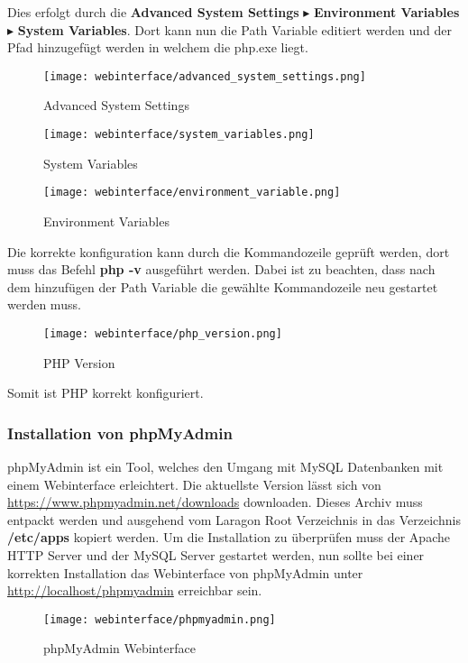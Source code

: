 Dies erfolgt durch die \textbf{Advanced System Settings} $\blacktriangleright$
\textbf{Environment Variables} $\blacktriangleright$ \textbf{System Variables}.
Dort kann nun die Path Variable editiert werden und der Pfad hinzugefügt werden
in welchem die php.exe liegt.

\begin{figure}[H]
  \centering
  \texttt{[image: webinterface/advanced\_system\_settings.png]}
  \caption{Advanced System Settings}
\end{figure}

\begin{figure}[H]
  \centering
  \texttt{[image: webinterface/system\_variables.png]}
  \caption{System Variables}
\end{figure}

\begin{figure}[H]
  \centering
  \texttt{[image: webinterface/environment\_variable.png]}
  \caption{Environment Variables}
\end{figure}

Die korrekte konfiguration kann durch die Kommandozeile geprüft werden, dort
muss das Befehl \textbf{php -v} ausgeführt werden. Dabei ist zu beachten, dass
nach dem hinzufügen der Path Variable die gewählte Kommandozeile neu gestartet
werden muss.

\begin{figure}[H]
  \centering
  \texttt{[image: webinterface/php\_version.png]}
  \caption{PHP Version}
\end{figure}

Somit ist PHP korrekt konfiguriert.

\subsubsection{Installation von phpMyAdmin}
phpMyAdmin ist ein Tool, welches den Umgang mit MySQL Datenbanken mit einem
Webinterface erleichtert. Die aktuellste Version lässt sich von
\url{https://www.phpmyadmin.net/downloads} downloaden. Dieses Archiv muss
entpackt werden und ausgehend vom Laragon Root Verzeichnis in das Verzeichnis
\textbf{/etc/apps} kopiert werden. Um die Installation zu überprüfen muss der
Apache HTTP Server und der MySQL Server gestartet werden, nun sollte bei einer
korrekten Installation das Webinterface von phpMyAdmin unter
\url{http://localhost/phpmyadmin} erreichbar sein.

\begin{figure}[H]
  \centering
  \texttt{[image: webinterface/phpmyadmin.png]}
  \caption{phpMyAdmin Webinterface}
\end{figure}

